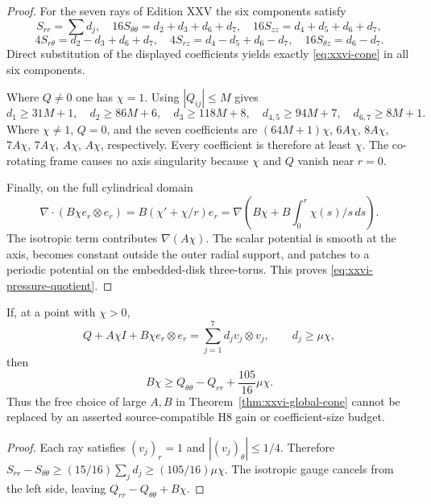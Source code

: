 \begin{proof}
For the seven rays of Edition XXV the six components satisfy
\[
S_{rr}=\sum d_j,\quad
16S_{\theta\theta}=d_2+d_3+d_6+d_7,\quad
16S_{zz}=d_4+d_5+d_6+d_7,
\]
\[
4S_{r\theta}=d_2-d_3+d_6+d_7,\quad
4S_{rz}=d_4-d_5+d_6-d_7,\quad
16S_{\theta z}=d_6-d_7.
\]
Direct substitution of the displayed coefficients yields exactly
\eqref{eq:xxvi-cone} in all six components.

Where $Q\ne0$ one has $\chi=1$.
Using $|Q_{ij}|\le M$ gives
\[
d_1\ge31M+1,\quad d_2\ge86M+6,\quad
d_3\ge118M+8,\quad
d_{4,5}\ge94M+7,\quad
d_{6,7}\ge8M+1.
\]
Where $\chi\ne1$, $Q=0$, and the seven coefficients are
$(64M+1)\chi$, $6A\chi$, $8A\chi$, $7A\chi$,
$7A\chi$, $A\chi$, $A\chi$, respectively.
Every coefficient is therefore at least $\chi$.
The co-rotating frame causes no axis singularity because $\chi$
and $Q$ vanish near $r=0$.

Finally, on the full cylindrical domain
\[
\nabla\cdot(B\chi e_r\otimes e_r)
=B(\chi'+\chi/r)e_r
=\nabla\left(B\chi+B\int_0^r\chi(s)/s\,ds\right).
\]
The isotropic term contributes $\nabla(A\chi)$.
The scalar potential is smooth at the axis, becomes constant
outside the outer radial support, and patches to a periodic
potential on the embedded-disk three-torus.
This proves \eqref{eq:xxvi-pressure-quotient}.
\end{proof}

\begin{proposition}
\label{prop:xxvi-gauge-cost}
If, at a point with $\chi>0$,
\[
Q+A\chi I+B\chi e_r\otimes e_r
=\sum_{j=1}^7d_jv_j\otimes v_j,
\qquad d_j\ge\mu\chi,
\]
then
\begin{equation}\label{eq:xxvi-gauge-cost}
\boxed{\quad B\chi\ge Q_{\theta\theta}-Q_{rr}
                  +\frac{105}{16}\mu\chi.\quad}
\end{equation}
Thus the free choice of large $A,B$ in
Theorem~\ref{thm:xxvi-global-cone} cannot be replaced by
an asserted source-compatible H8 gain or coefficient-size budget.
\end{proposition}
\begin{proof}
Each ray satisfies $(v_j)_r=1$ and
$|(v_j)_\theta|\le1/4$. Therefore
$S_{rr}-S_{\theta\theta}\ge(15/16)\sum_jd_j
\ge(105/16)\mu\chi$.
The isotropic gauge cancels from the left side, leaving
$Q_{rr}-Q_{\theta\theta}+B\chi$.
\end{proof}

